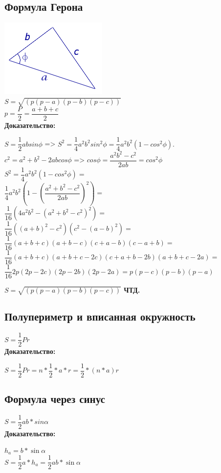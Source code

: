 \documentclass[12pt, letterpaper]{article}
\begin{document}
\subsection {Формула Герона}
\includegraphics[scale=1]{asset.png} \\
$S=\sqrt{(p(p-a)(p-b)(p-c))}$ \\
$p=\dfrac{P}{2}=\dfrac{a+b+c}{2}$ \\
\textbf{Доказательство:} \\
\begin{flushleft}
$S=\dfrac{1}{2}absin\phi$ => $S^2=\dfrac{1}{4}a^2b^2sin^2\phi=\dfrac{1}{4}a^2b^2(1-cos^2\phi).$ \\
$c^2=a^2+b^2-2abcos\phi$ => $cos\phi=\dfrac{a^2b^2-c^2}{2ab}=cos^2\phi$\\
$S^2=\dfrac{1}{4}a^2b^2(1-cos^2\phi)= $ \\
$ \dfrac{1}{4}a^2b^2(1-(\dfrac{a^2+b^2-c^2}{2ab})^2)=$ \\
$ \dfrac{1}{16}(4a^2b^2-(a^2+b^2-c^2)^2)= $ \\
$ \dfrac{1}{16}((a+b)^2-c^2)(c^2-(a-b)^2)= $ \\
$ \dfrac{1}{16}(a+b+c)(a+b-c)(c+a-b)(c-a+b)= $ \\
$ \dfrac{1}{16}(a+b+c)(a+b+c-2c)(c+a+b-2b)(a+b+c-2a)= $ \\ 
$ \dfrac{1}{16}2p(2p-2c)(2p-2b)(2p-2a)= p(p-c)(p-b)(p-a)$ \\
\end{flushleft}
\textbf{$ S=\sqrt{(p(p-a)(p-b)(p-c))} $ ЧТД.}

\subsection {Полупериметр и вписанная окружность}
$S=\dfrac{1}{2}Pr$ \\
\textbf{Доказательство:} \\
\begin{flushleft}
$S=\dfrac{1}{2}Pr=n*\dfrac{1}{2}*a*r=\dfrac{1}{2}*(n*a)r$ \\
\end{flushleft}

\subsection {Формула через синус}
$S=\dfrac{1}{2}ab*sin\alpha $ \\
\textbf{Доказательство:} \\
\begin{flushleft}
$h_a=b*\sin \alpha $ \\
$S=\dfrac{1}{2} a*h_a= \dfrac{1}{2}ab*\sin \alpha $ \\
\end{flushleft}
\end{document}

